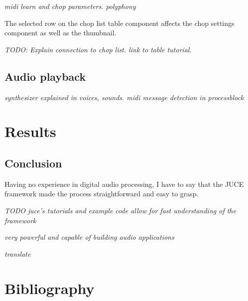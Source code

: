 \documentclass[12pt, a4paper, hidelinks]{article}
\begin{document}
	\textit{	midi learn and chop parameters. polyphony}
    
   	The selected row on the chop list table component affects the chop settings component as well as the thumbnail. %

	\textit{TODO:}
	\textit{Explain connection to chop list. link to table tutorial.}\par
	

	
	
	
	\newpage
	\subsection{Audio playback}
	\textit{	synthesizer explained in voices, sounds. midi message detection in processblock }
	\par
	
	
	
	
	\newpage
	\section{Results}
	
	
	


	\newpage
	\subsection{Conclusion}
	Having no experience in digital audio processing, I have to say that the JUCE framework made the process straightforward and easy to grasp.

\textit{TODO}
\textit{	juce's tutorials and example code allow for fast understanding of the framework}

\textit{	very powerful and capable of building audio applications}

\textit{translate}
	
		
	\newpage
	\section{Bibliography}
	\printbibliography
	
\end{document}
